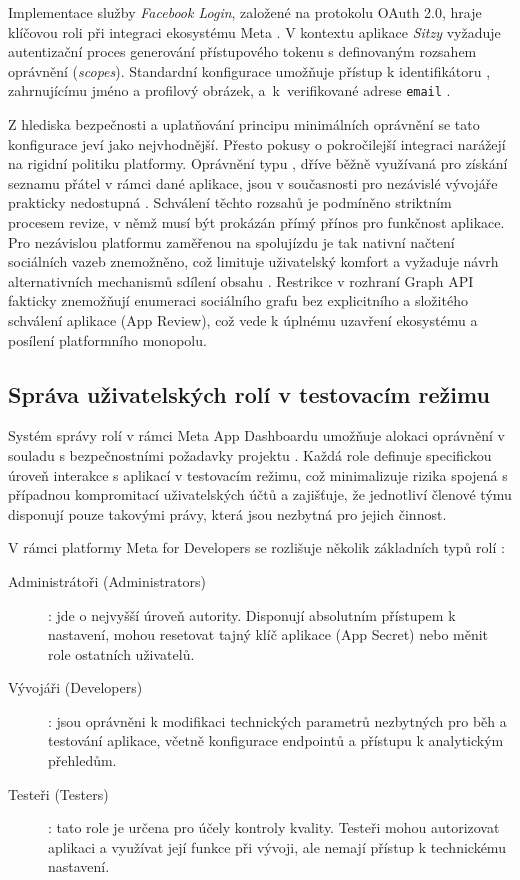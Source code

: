 \documentclass[male,czech,api_bc]{kitheses}
\begin{document}
Implementace služby \textit{Facebook Login}, založené na protokolu OAuth 2.0, hraje klíčovou roli při integraci ekosystému Meta \cite{Hardt2012}. V kontextu aplikace \textit{Sitzy} vyžaduje autentizační proces generování přístupového tokenu s definovaným rozsahem oprávnění (\textit{scopes}). Standardní konfigurace umožňuje přístup k identifikátoru , zahrnujícímu jméno a profilový obrázek, a~k~verifikované adrese \texttt{email} \cite{MetaDeveloper20251030}.

Z hlediska bezpečnosti a uplatňování principu minimálních oprávnění se tato konfigurace jeví jako nejvhodnější. Přesto pokusy o pokročilejší integraci narážejí na rigidní politiku platformy. Oprávnění typu , dříve běžně využívaná pro získání seznamu přátel v rámci dané aplikace, jsou v současnosti pro nezávislé vývojáře prakticky nedostupná \cite{DeveloperPolicies20250602}. Schválení těchto rozsahů je podmíněno striktním procesem revize, v němž musí být prokázán přímý přínos pro funkčnost aplikace. Pro nezávislou platformu zaměřenou na spolujízdu je tak nativní načtení sociálních vazeb znemožněno, což limituje uživatelský komfort a vyžaduje návrh alternativních mechanismů sdílení obsahu \cite{Marro2025}. Restrikce v rozhraní Graph API fakticky znemožňují enumeraci sociálního grafu bez explicitního a složitého schválení aplikace (App Review), což vede k úplnému uzavření ekosystému a posílení platformního monopolu.

\subsection{Správa uživatelských rolí v testovacím režimu}
\label{subsec:sprava_uzivatelskych_roli_v_testovacim_rezimu}

Systém správy rolí v rámci Meta App Dashboardu umožňuje alokaci oprávnění v souladu s bezpečnostními požadavky projektu \cite{MetaAppRoles2025}. Každá role definuje specifickou úroveň interakce s aplikací v testovacím režimu, což minimalizuje rizika spojená s případnou kompromitací uživatelských účtů a zajišťuje, že jednotliví členové týmu disponují pouze takovými právy, která jsou nezbytná pro jejich činnost.

V rámci platformy Meta for Developers se rozlišuje několik základních typů rolí \cite{MetaAppRoles2025}:
\begin{description}
    \item[Administrátoři (Administrators)]: jde o nejvyšší úroveň autority. Disponují absolutním přístupem k nastavení, mohou resetovat tajný klíč aplikace (App Secret) nebo měnit role ostatních uživatelů. 
    
    \item[Vývojáři (Developers)]: jsou oprávněni k modifikaci technických parametrů nezbytných pro běh a testování aplikace, včetně konfigurace endpointů a přístupu k analytickým přehledům.
    
    \item[Testeři (Testers)]: tato role je určena pro účely kontroly kvality. Testeři mohou autorizovat aplikaci a využívat její funkce při vývoji, ale nemají přístup k technickému nastavení. 
\end{description}
\end{document}
